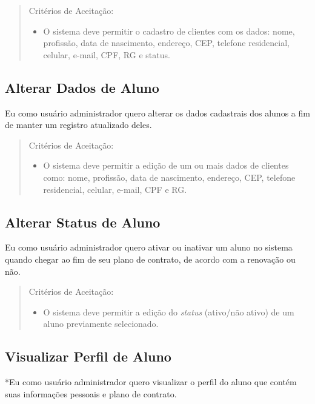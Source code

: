 \begin{quote}
Critérios de Aceitação:
    \begin{itemize}
        \item O sistema deve permitir o cadastro de clientes com os dados: nome, profissão,
        data de nascimento, endereço, CEP, telefone residencial, celular, e-mail, CPF,
        RG e status.
    \end{itemize}
\end{quote}

\subsection[Alterar Dados de Aluno]{Alterar Dados de Aluno}
Eu como usuário administrador quero alterar os dados cadastrais dos alunos a fim
de manter um registro atualizado deles.

\begin{quote}
Critérios de Aceitação:
    \begin{itemize}
        \item O sistema deve permitir a edição de um ou mais dados de clientes como: nome,
        profissão, data de nascimento, endereço, CEP, telefone residencial, celular,
        e-mail, CPF e RG.
    \end{itemize}
\end{quote}

\subsection[Alterar Status de Aluno]{Alterar Status de Aluno}
Eu como usuário administrador quero ativar ou inativar um aluno no sistema
quando chegar ao fim de seu plano de contrato, de acordo com a renovação ou não.

\begin{quote}
Critérios de Aceitação:
    \begin{itemize}
        \item O sistema deve permitir a edição do \textsl{status} (ativo/não ativo) de um aluno
        previamente selecionado.
    \end{itemize}
\end{quote}

\subsection[Visualizar Perfil de Aluno]{Visualizar Perfil de Aluno}
*Eu como usuário administrador quero visualizar o perfil do aluno que contém suas
informações pessoais e plano de contrato.

